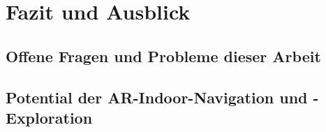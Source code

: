 \chapter{Fazit und Ausblick}
\label{chap:closing}

\section{Offene Fragen und Probleme dieser Arbeit}

\section{Potential der AR-Indoor-Navigation und -Exploration}

%
\cleardoublepage
